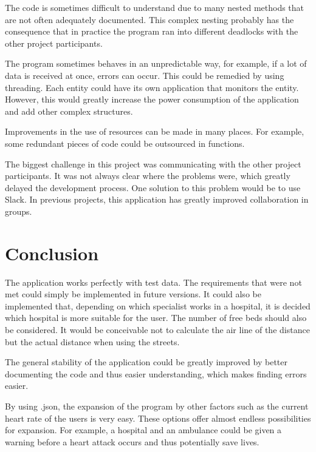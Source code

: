 The code is sometimes difficult to understand due to many nested methods that are not often adequately documented. This complex nesting probably has the consequence that in practice the program ran into different deadlocks with the other project participants.

The program sometimes behaves in an unpredictable way, for example, if a lot of data is received at once, errors can occur. This could be remedied by using threading. Each entity could have its own application that monitors the entity. However, this would greatly increase the power consumption of the application and add other complex structures. 

Improvements in the use of resources can be made in many places. For example, some redundant pieces of code could be outsourced in functions.

The biggest challenge in this project was communicating with the other project participants. It was not always clear where the problems were, which greatly delayed the development process. One solution to this problem would be to use Slack. In previous projects, this application has greatly improved collaboration in groups.


\section{Conclusion}
\label{sec:5}
The application works perfectly with test data. The requirements that were not met could simply be implemented in future versions. It could also be implemented that, depending on which specialist works in a hospital, it is decided which hospital is more suitable for the user. The number of free beds should also be considered. It would be conceivable not to calculate the air line of the distance but the actual distance when using the streets.

The general stability of the application could be greatly improved by better documenting the code and thus easier understanding, which makes finding errors easier.

By using .json, the expansion of the program by other factors such as the current heart rate of the users is very easy. These options offer almost endless possibilities for expansion. For example, a hospital and an ambulance could be given a warning before a heart attack occurs and thus potentially save lives.

\newpage


